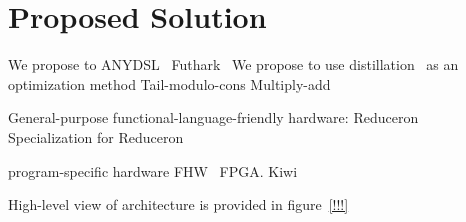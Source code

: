 \section{Proposed Solution}

We propose to  ANYDSL~\cite{!!!} Futhark~\cite{!!!}
We propose to use distillation~\cite{!!!} as an optimization method Tail-modulo-cons  Multiply-add

General-purpose functional-language-friendly hardware: Reduceron~\cite{!!!} Specialization for Reduceron~\cite{!!!}

program-specific hardware FHW~\cite{!!!} FPGA. Kiwi

High-level view of architecture is provided in figure~\ref{!!!}